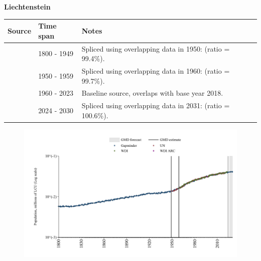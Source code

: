 \documentclass[12pt,a4paper,landscape]{article}
\begin{document}
\begin{adjustbox}{max totalsize={\paperwidth}{\paperheight},center}
\begin{minipage}[t][\textheight][t]{\textwidth}
\vspace*{0.5cm}
{}
\begin{center}
{\Large\bfseries Liechtenstein}
\end{center}
\vspace{0.5cm}
\begin{table}[H]
\centering
\small
\begin{tabular}{|l|l|l|}
\hline
\textbf{Source} & \textbf{Time span} & \textbf{Notes} \\
\hline
\rowcolor{white}\cite{Gapminder}& 1800 - 1949 &Spliced using overlapping data in 1950: (ratio = 99.4\%).\\
\rowcolor{lightgray}\cite{UN}& 1950 - 1959 &Spliced using overlapping data in 1960: (ratio = 99.7\%).\\
\rowcolor{white}\cite{WDI}& 1960 - 2023 &Baseline source, overlaps with base year 2018.\\
\rowcolor{lightgray}\cite{Gapminder}& 2024 - 2030 &Spliced using overlapping data in 2031: (ratio = 100.6\%).\\
\hline
\end{tabular}
\end{table}
\begin{figure}[H]
\centering
\includegraphics[width=\textwidth,height=0.6\textheight,keepaspectratio]{graphs/LIE_pop.pdf}
\end{figure}
\end{minipage}
\end{adjustbox}
\end{document}
